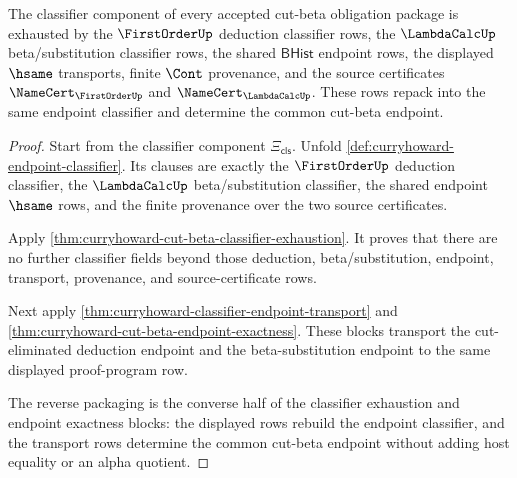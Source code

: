\begin{theorem}
\label{thm:curryhoward-endpoint-classifier-obligation-surface}
The classifier component of every accepted cut-beta obligation package is
exhausted by the $\FirstOrderUp$ deduction classifier rows, the $\LambdaCalcUp$
beta/substitution classifier rows, the shared $\mathsf{BHist}$ endpoint rows,
the displayed $\hsame$ transports, finite $\Cont$ provenance, and the source
certificates $\NameCert_{\FirstOrderUp}$ and $\NameCert_{\LambdaCalcUp}$.
These rows repack into the same endpoint classifier and determine the common
cut-beta endpoint.
\end{theorem}
\begin{proof}
Start from the classifier component
$\Xi_{\mathsf{cls}}$. Unfold
\autoref{def:curryhoward-endpoint-classifier}. Its clauses are exactly the
$\FirstOrderUp$ deduction classifier, the $\LambdaCalcUp$ beta/substitution
classifier, the shared endpoint $\hsame$ rows, and the finite provenance over
the two source certificates.

Apply \autoref{thm:curryhoward-cut-beta-classifier-exhaustion}. It proves that
there are no further classifier fields beyond those deduction,
beta/substitution, endpoint, transport, provenance, and source-certificate
rows.

Next apply \autoref{thm:curryhoward-classifier-endpoint-transport} and
\autoref{thm:curryhoward-cut-beta-endpoint-exactness}. These blocks transport
the cut-eliminated deduction endpoint and the beta-substitution endpoint to the
same displayed proof-program row.

The reverse packaging is the converse half of the classifier exhaustion and
endpoint exactness blocks: the displayed rows rebuild the endpoint classifier,
and the transport rows determine the common cut-beta endpoint without adding
host equality or an alpha quotient.
\end{proof}

